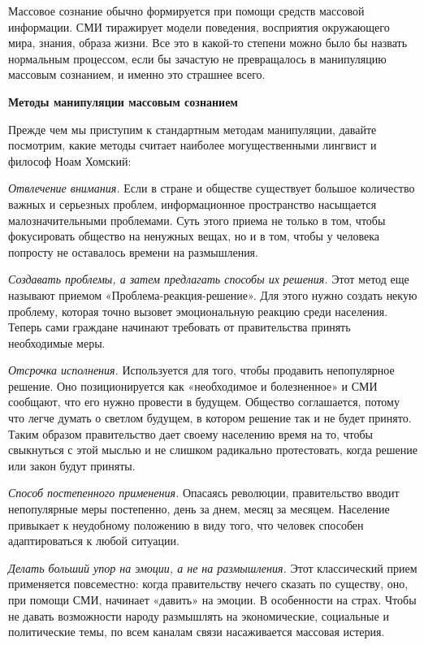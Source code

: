 Массовое сознание обычно формируется при помощи средств массовой информации. СМИ тиражирует модели поведения, восприятия окружающего мира, знания, образа жизни. Все это в какой-то степени можно было бы назвать нормальным процессом, если бы зачастую не превращалось в манипуляцию массовым сознанием, и именно это страшнее всего.

\textbf{Методы манипуляции массовым сознанием}

Прежде чем мы приступим к стандартным методам манипуляции, давайте посмотрим, какие методы считает наиболее могущественными лингвист и философ Ноам Хомский:

\textit{Отвлечение внимания.} Если в стране и обществе существует большое количество важных и серьезных проблем, информационное пространство насыщается малозначительными проблемами. Суть этого приема не только в том, чтобы фокусировать общество на ненужных вещах, но и в том, чтобы у человека попросту не оставалось времени на размышления.

\textit{Создавать проблемы, а затем предлагать способы их решения.} Этот метод еще называют приемом «Проблема-реакция-решение». Для этого нужно создать некую проблему, которая точно вызовет эмоциональную реакцию среди населения. Теперь сами граждане начинают требовать от правительства принять необходимые меры.

\textit{Отсрочка исполнения.} Используется для того, чтобы продавить непопулярное решение. Оно позиционируется как «необходимое и болезненное» и СМИ сообщают, что его нужно провести в будущем. Общество соглашается, потому что легче думать о светлом будущем, в котором решение так и не будет принято. Таким образом правительство дает своему населению время на то, чтобы свыкнуться с этой мыслью и не слишком радикально протестовать, когда решение или закон будут приняты.

\textit{Способ постепенного применения.} Опасаясь революции, правительство вводит непопулярные меры постепенно, день за днем, месяц за месяцем. Население привыкает к неудобному положению в виду того, что человек способен адаптироваться к любой ситуации.

\textit{Делать больший упор на эмоции, а не на размышления.} Этот классический прием применяется повсеместно: когда правительству нечего сказать по существу, оно, при помощи СМИ, начинает «давить» на эмоции. В особенности на страх. Чтобы не давать возможности народу размышлять на экономические, социальные и политические темы, по всем каналам связи насаживается массовая истерия.

